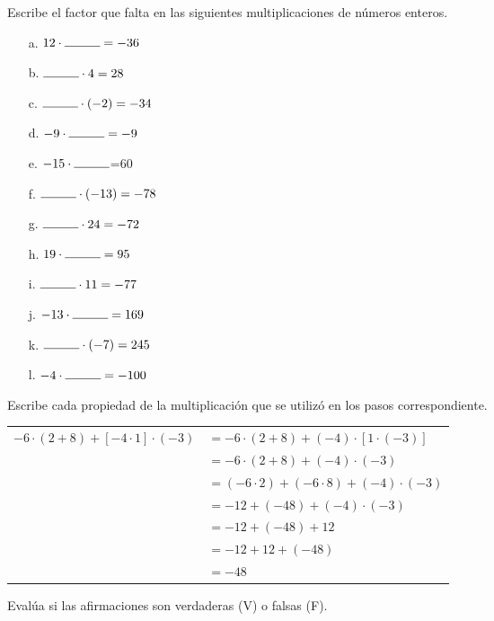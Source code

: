 \documentclass[spanish,letterpaper, 11pt, addpoints, answers]{exam}
\begin{document}
\begin{questions}
  \question Escribe el factor que falta en las siguientes multiplicaciones de números enteros.

  \begin{multicols}{2}
    
 
    \begin{itemize}
      \item[a.] $12\cdot \rule{1cm}{0.4pt}=-36$
      \item[b.] $\rule{1cm}{0.4pt}\cdot 4=28$
      \item[c.] $\rule{1cm}{0.4pt}\cdot (-2)=-34$
      \item[d.] $-9\cdot \rule{1cm}{0.4pt}=-9$
      \item[e.] $-15\cdot \rule{1cm}{0.4pt}$=60
      \item[f.] $\rule{1cm}{0.4pt}\cdot (-13)=-78$
      \item[g.] $\rule{1cm}{0.4pt}\cdot 24=-72$
      \item[h.] $19\cdot \rule{1cm}{0.4pt}=95$
      \item[i.] $\rule{1cm}{0.4pt}\cdot 11=-77$
      \item[j.] $-13\cdot \rule{1cm}{0.4pt}=169$
      \item[k.] $\rule{1cm}{0.4pt}\cdot (-7)=245$
      \item[l.] $-4\cdot \rule{1cm}{0.4pt}=-100$
       
    \end{itemize}
   \end{multicols}

\question Escribe cada propiedad de la multiplicación que se utilizó en los pasos correspondiente.

\begin{center}
\begin{tabular}{rl}
  $-6\cdot (2+8)+[-4\cdot 1]\cdot (-3)$&$=-6\cdot (2+8)+(-4)\cdot [1\cdot (-3)]$\\
  &$=-6\cdot (2+8)+(-4)\cdot (-3)$\\
  &$=(-6\cdot 2)+(-6\cdot 8)+(-4)\cdot (-3)$\\
  &$=-12+(-48)+(-4)\cdot (-3)$\\
  &$=-12+(-48)+12$\\
  &$=-12+12+(-48)$\\
  &$=-48$\\
\end{tabular}
\end{center}

\question Evalúa si las afirmaciones son verdaderas (V) o falsas (F).


\end{questions}
\end{document}
